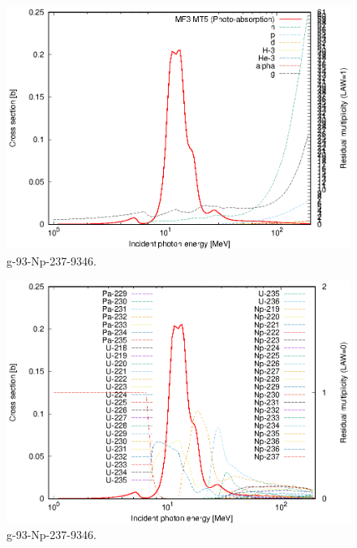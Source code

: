\begin{figure}
 \includegraphics[width=\linewidth]{eps/g_93-Np-237_9346.eps}
  \caption{g-93-Np-237-9346.}
\end{figure}
\begin{figure}
 \includegraphics[width=\linewidth]{eps-law0/g_93-Np-237_9346.eps}
 \caption{g-93-Np-237-9346.}
\end{figure}
\newpage \clearpage

